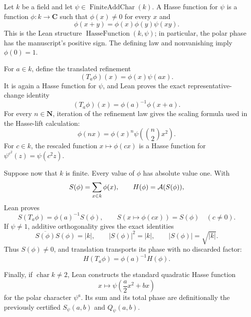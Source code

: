 \begin{definition}\label{mod:finitefield-hassefunction}
Let $k$ be a field and let
$\psi\in\operatorname{FiniteAddChar}(k)$.  A Hasse function for $\psi$
is a function $\phi:k\to\mathbf C$ such that $\phi(x)\ne0$ for every
$x$ and
\[
 \phi(x+y)=\phi(x)\phi(y)\psi(xy).
\]
This is the Lean structure $\operatorname{HasseFunction}(k,\psi)$; in
particular, the polar phase has the manuscript's positive sign.
The defining law and nonvanishing imply $\phi(0)=1$.

For $a\in k$, define the translated refinement
\[
 (T_a\phi)(x)=\phi(x)\psi(ax).
\]
It is again a Hasse function for $\psi$, and Lean proves the exact
representative-change identity
\[
 (T_a\phi)(x)=\phi(a)^{-1}\phi(x+a).
\]
For every $n\in\mathbf N$, iteration of the refinement law gives the
scaling formula used in the Hasse-lift calculation:
\[
 \phi(n x)=\phi(x)^n
   \psi\!\left(\binom n2x^2\right).
\]
For $c\in k$, the rescaled function $x\mapsto\phi(cx)$ is a Hasse
function for $\psi^{c^2}(z)=\psi(c^2z)$.

Suppose now that $k$ is finite.  Every value of $\phi$ has absolute
value one.  With
\[
 S(\phi)=\sum_{x\in k}\phi(x),
 \qquad H(\phi)=\mathcal A(S(\phi)),
\]
Lean proves
\[
 S(T_a\phi)=\phi(a)^{-1}S(\phi),
 \qquad
 S(x\mapsto\phi(cx))=S(\phi)\quad(c\ne0).
\]
If $\psi\ne1$, additive orthogonality gives the exact identities
\[
 \overline{S(\phi)}S(\phi)=|k|,
 \qquad |S(\phi)|^2=|k|,
 \qquad |S(\phi)|=\sqrt{|k|}.
\]
Thus $S(\phi)\ne0$, and translation transports its phase with no
discarded factor:
\[
 H(T_a\phi)=\phi(a)^{-1}H(\phi).
\]

Finally, if $\operatorname{char}k\ne2$, Lean constructs the standard
quadratic Hasse function
\[
 x\longmapsto\psi\!\left(\frac a2x^2+bx\right)
\]
for the polar character $\psi^a$.  Its sum and its total phase are
definitionally the previously certified
$S_\psi(a,b)$ and $Q_\psi(a,b)$.
\leanok
{}
\FormalizationContract
\end{definition}
